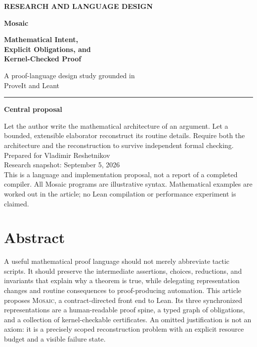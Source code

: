 \documentclass[11pt,a4paper]{article}
\newcommand{\Mosaic}{\textsc{Mosaic}}
\theoremstyle{definition}
\theoremstyle{remark}
\begin{document}
\begin{titlepage}
\vspace*{13mm}
{\sffamily\small\bfseries\color{muted}RESEARCH AND LANGUAGE DESIGN\par}
\vspace{10mm}
{\fontsize{38}{43}\selectfont\bfseries\color{ink}Mosaic\par}
\vspace{5mm}
{\LARGE\bfseries Mathematical Intent,\\[3pt] Explicit Obligations, and\\[3pt] Kernel-Checked Proof\par}
\vspace{8mm}
{\large A proof-language design study grounded in\\ProveIt and Leant\par}
\vspace{13mm}
\hrule
\vspace{6mm}
\noindent\textbf{Central proposal}\par
\medskip
\noindent Let the author write the mathematical architecture of an argument. Let a bounded, extensible elaborator reconstruct its routine details. Require both the architecture and the reconstruction to survive independent formal checking.
\vfill
\noindent Prepared for Vladimir Reshetnikov\\
Research snapshot: September 5, 2026\\
\medskip
\noindent\small This is a language and implementation proposal, not a report of a completed compiler. All Mosaic programs are illustrative syntax. Mathematical examples are worked out in the article; no Lean compilation or performance experiment is claimed.
\vspace{7mm}
\end{titlepage}
\section*{Abstract}
A useful mathematical proof language should not merely abbreviate tactic scripts. It should preserve the intermediate assertions, choices, reductions, and invariants that explain why a theorem is true, while delegating representation changes and routine consequences to proof-producing automation. This article proposes \Mosaic{}, a contract-directed front end to Lean. Its three synchronized representations are a human-readable proof spine, a typed graph of obligations, and a collection of kernel-checkable certificates. An omitted justification is not an axiom: it is a precisely scoped reconstruction problem with an explicit resource budget and a visible failure state.
\end{document}
